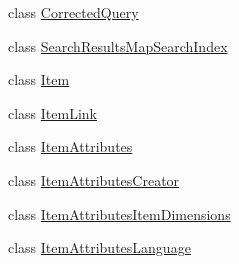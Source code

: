 \begin{DoxyCompactItemize}
class \hyperlink{class_price___comparison_1_1amazon_1_1ecs_1_1_corrected_query}{Corrected\-Query}
\begin{DoxyCompactList}\small\item\em \end{DoxyCompactList}\item 
class \hyperlink{class_price___comparison_1_1amazon_1_1ecs_1_1_search_results_map_search_index}{Search\-Results\-Map\-Search\-Index}
\begin{DoxyCompactList}\small\item\em \end{DoxyCompactList}\item 
class \hyperlink{class_price___comparison_1_1amazon_1_1ecs_1_1_item}{Item}
\begin{DoxyCompactList}\small\item\em \end{DoxyCompactList}\item 
class \hyperlink{class_price___comparison_1_1amazon_1_1ecs_1_1_item_link}{Item\-Link}
\begin{DoxyCompactList}\small\item\em \end{DoxyCompactList}\item 
class \hyperlink{class_price___comparison_1_1amazon_1_1ecs_1_1_item_attributes}{Item\-Attributes}
\begin{DoxyCompactList}\small\item\em \end{DoxyCompactList}\item 
class \hyperlink{class_price___comparison_1_1amazon_1_1ecs_1_1_item_attributes_creator}{Item\-Attributes\-Creator}
\begin{DoxyCompactList}\small\item\em \end{DoxyCompactList}\item 
class \hyperlink{class_price___comparison_1_1amazon_1_1ecs_1_1_item_attributes_item_dimensions}{Item\-Attributes\-Item\-Dimensions}
\begin{DoxyCompactList}\small\item\em \end{DoxyCompactList}\item 
class \hyperlink{class_price___comparison_1_1amazon_1_1ecs_1_1_item_attributes_language}{Item\-Attributes\-Language}
\begin{DoxyCompactList}\small\item\em \end{DoxyCompactList}\item 

\end{DoxyCompactItemize}
